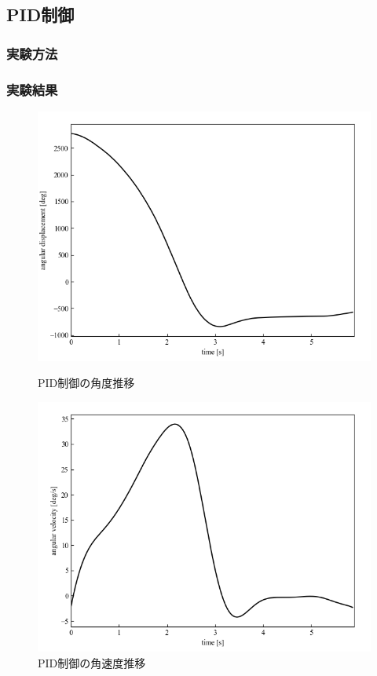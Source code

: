   \subsection{PID制御}
  \subsubsection{実験方法}
  \subsubsection{実験結果}

\begin{figure}[h]
	\centering
	\begin{minipage}{0.43\columnwidth}
	  \centering
	  \includegraphics[width=\columnwidth]{./figure/PIDdeg.png}
	  \caption{PID制御の角度推移}
	  \label{fig:PIDdeg}
	\end{minipage}
	\hspace{5mm}
	\begin{minipage}{0.43\columnwidth}
	  \centering
	  \includegraphics[width=\columnwidth]{./figure/PIDdegpers.png}
	  \caption{PID制御の角速度推移}
	  \label{fig:PIDdegpers}
	\end{minipage}
\end{figure}

